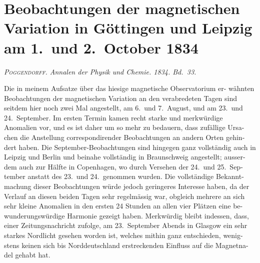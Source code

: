 \documentclass[12pt,a4paper]{article}
\begin{document}
\newpage
\section*{Beobachtungen der magnetischen Variation in Göttingen und Leipzig am 1.\ und 2.\ October 1834}

\textit{\textsc{Poggendorff}. Annalen der Physik und Chemie. 1834. Bd.\ 33.}

Die in meinem Aufsatze über das hiesige magnetische Observatorium er-
wähnten Beobachtungen der magnetischen Variation an den verabredeten Tagen 
sind seitdem hier noch zwei Mal angestellt, am 6.\ und 7.\ August, und am 23.\ 
und 24.\ September. Im ersten Termin kamen recht starke und merkwürdige 
Anomalien vor, und es ist daher um so mehr zu bedauern, dass zufällige Ursa-
chen die Anstellung correspondirender Beobachtungen an andern Orten gehin-
dert haben. Die September-Beobachtungen sind hingegen ganz vollständig auch 
in Leipzig und Berlin und beinahe vollständig in Braunschweig angestellt; ausser-
dem auch zur Hälfte in Copenhagen, wo durch Versehen der 24.\ und 25.\ Sep-
tember anstatt des 23.\ und 24.\ genommen wurden. Die vollständige Bekannt-
machung dieser Beobachtungen würde jedoch geringeres Interesse haben, da der 
Verlauf an diesen beiden Tagen sehr regelmässig war, obgleich mehrere an sich 
sehr kleine Anomalien in den ersten 24 Stunden an allen vier Plätzen eine be-
wunderungswürdige Harmonie gezeigt haben. Merkwürdig bleibt indessen, dass, 
einer Zeitungsnachricht zufolge, am 23.\ September Abends in Glasgow ein sehr 
starkes Nordlicht gesehen worden ist, welches mithin ganz entschieden, wenig-
stens keinen sich bis Norddeutschland erstreckenden Einfluss auf die Magnetna-
del gehabt hat.
\end{document}
